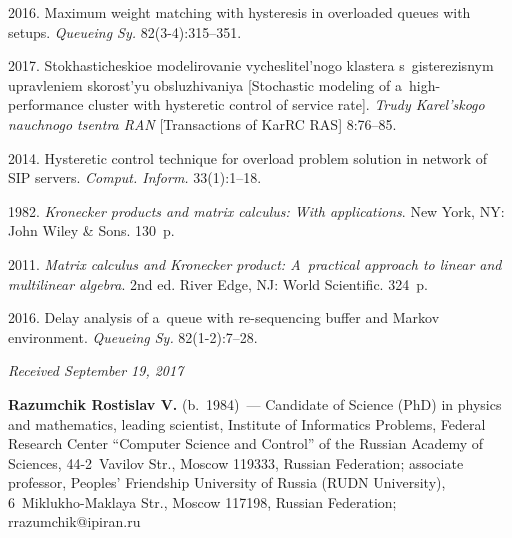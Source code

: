 \begin{multicols}{2}
{{\begin{thebibliography}{9}
 2016.
Maximum weight matching with hysteresis in overloaded queues with setups.
\textit{Queueing Sy.} 82(3-4):315--351.

 2017.
Stokhasticheskioe modelirovanie vycheslitel'nogo klastera s~gisterezisnym upravleniem
skorost'yu obsluzhivaniya
[Stochastic modeling of a~high-performance cluster
with hysteretic control of service rate].
\textit{Trudy Karel'skogo nauchnogo tsentra RAN}
[Transactions of KarRC RAS] 8:76--85.

 2014.
Hysteretic control technique for overload problem solution in network of SIP servers.
\textit{Comput. Inform.} 33(1):1--18.




 1982.
\textit{Kronecker products and matrix calculus: With applications}. 
New York, NY: John Wiley \& Sons. 130~p.

 2011.
\textit{Matrix calculus and Kronecker product: A~practical 
approach to linear and multilinear algebra}. 2nd ed. River Edge,
NJ: World Scientific. 324~p.

 2016.
Delay analysis of a~queue with re-sequencing buffer
and Markov environment.
\textit{Queueing Sy.} 82(1-2):7--28.

\end{thebibliography} }
 }

\end{multicols}

\vspace*{-3pt}

\hfill{\small\textit{Received September 19, 2017}}



\Contrl

\noindent
\textbf{Razumchik Rostislav V.} (b.\ 1984)~--- 
Candidate of Science (PhD) in physics and mathematics, leading scientist, 
Institute of Informatics Problems, Federal Research Center 
``Computer Science and Control'' of the Russian Academy of Sciences, 
44-2~Vavilov Str., Moscow 119333, Russian Federation; associate professor, 
Peoples' Friendship University of Russia (RUDN University), 
6~Miklukho-Maklaya Str., Moscow 117198, Russian Federation; 
\mbox{rrazumchik@ipiran.ru}

